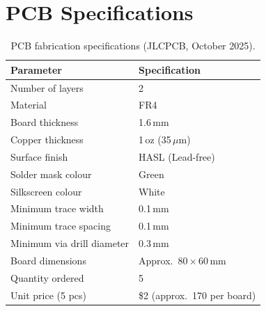 \section{PCB Specifications}
\label{app:pcb_specs}

\begin{table}[H]
\centering
\caption{PCB fabrication specifications (JLCPCB, October 2025).}
\label{tab:pcb_specs}
\begin{tabular}{@{}ll@{}}
\toprule
\textbf{Parameter} & \textbf{Specification} \\
\midrule
Number of layers & 2 \\
Material & FR4 \\
Board thickness & 1.6\,mm \\
Copper thickness & 1\,oz (35\,$\mu$m) \\
Surface finish & HASL (Lead-free) \\
Solder mask colour & Green \\
Silkscreen colour & White \\
Minimum trace width & 0.1\,mm \\
Minimum trace spacing & 0.1\,mm \\
Minimum via drill diameter & 0.3\,mm \\
Board dimensions & Approx.\ $80 \times 60$\,mm \\
Quantity ordered & 5 \\
Unit price (5 pcs) & \$2 (approx.\ \rupee{}170 per board) \\
\bottomrule
\end{tabular}
\end{table}
